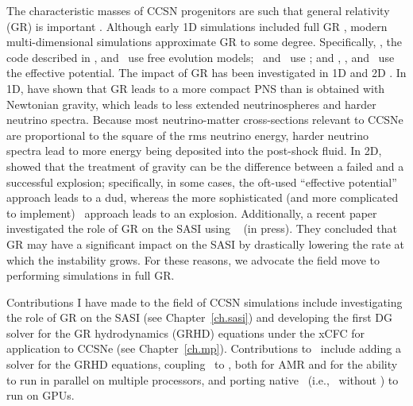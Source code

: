 The characteristic masses of CCSN progenitors are such that general relativity
(GR) is important \citep[e.g., see][]{lmt2001}.
Although early 1D simulations included full GR
\citep[e.g.,][]{mw1966}, modern multi-dimensional simulations approximate
GR to some degree.
Specifically, \zelmani, the code described in
\citet{ktk2016}, and \nadafld\ use free evolution models;
\cocov\ and \gmunu\ use \xcfc;
and \fornax, \chimera, and \flashx\ use the effective potential\citeme.
The impact of GR has been investigated in 1D \citep{bdm2001,lmm2012}
and 2D \citep{mjm2012,oc2018}.
In 1D, \citet{bdm2001} have shown that GR leads to a more compact PNS than is
obtained with Newtonian gravity, which leads to less extended neutrinospheres
and harder neutrino spectra.
Because most neutrino-matter cross-sections relevant to CCSNe are proportional to
the square of the rms neutrino energy, harder neutrino spectra lead to more
energy being deposited into the post-shock fluid.
In 2D, \citet{mjm2012} showed that the treatment of gravity
can be the difference between a failed and a successful explosion;
specifically, in some cases, the oft-used
``effective potential'' approach \citep{mdj2006} leads to a dud, whereas
the more sophisticated (and more complicated to implement) \xcfc\ approach
leads to an explosion.  
Additionally, a recent paper investigated the role of GR on the SASI
using \thornado\ \citep{dem2023} (in press).
They concluded that GR may have a significant impact on the SASI by drastically
lowering the rate at which the instability grows.
For these reasons, we advocate the field move to performing simulations
in full GR.

Contributions I have made to the field of CCSN simulations
include investigating the role of GR
on the SASI (see Chapter~\ref{ch.sasi}) and developing the first DG solver
for the GR hydrodynamics (GRHD) equations under the xCFC
for application to CCSNe (see Chapter~\ref{ch.mp}).
Contributions to \thornado\ include adding a solver for the GRHD equations,
coupling \thornado\ to \amrex, both for AMR and for the ability to run
in parallel on multiple processors,
and porting native \thornado\ (i.e., \thornado\ without \amrex)
to run on GPUs.  

